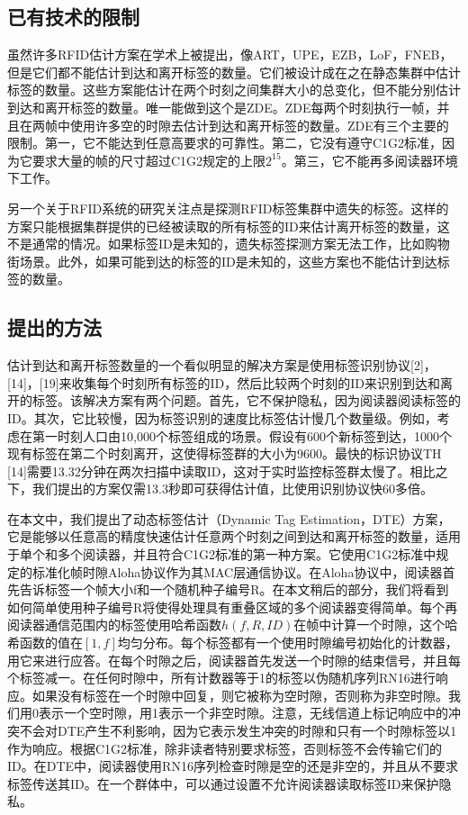 \documentclass[UTF8]{ctexart}
\begin{document}
	\subsection{已有技术的限制}
	虽然许多RFID估计方案在学术上被提出，像ART，UPE，EZB，LoF，FNEB，但是它们都不能估计到达和离开标签的数量。它们被设计成在之在静态集群中估计标签的数量。这些方案能估计在两个时刻之间集群大小的总变化，但不能分别估计到达和离开标签的数量。唯一能做到这个是ZDE。ZDE每两个时刻执行一帧，并且在两帧中使用许多空的时隙去估计到达和离开标签的数量。ZDE有三个主要的限制。第一，它不能达到任意高要求的可靠性。第二，它没有遵守C1G2标准，因为它要求大量的帧的尺寸超过C1G2规定的上限$2^{15}$。第三，它不能再多阅读器环境下工作。
	
	另一个关于RFID系统的研究关注点是探测RFID标签集群中遗失的标签。这样的方案只能根据集群提供的已经被读取的所有标签的ID来估计离开标签的数量，这不是通常的情况。如果标签ID是未知的，遗失标签探测方案无法工作，比如购物街场景。此外，如果可能到达的标签的ID是未知的，这些方案也不能估计到达标签的数量。
	
	\subsection{提出的方法}
	估计到达和离开标签数量的一个看似明显的解决方案是使用标签识别协议[2]，[14]，[19]来收集每个时刻所有标签的ID，然后比较两个时刻的ID来识别到达和离开的标签。该解决方案有两个问题。首先，它不保护隐私，因为阅读器阅读标签的ID。其次，它比较慢，因为标签识别的速度比标签估计慢几个数量级。例如，考虑在第一时刻人口由10,000个标签组成的场景。假设有600个新标签到达，1000个现有标签在第二个时刻离开，这使得标签群的大小为9600。最快的标识协议TH [14]需要13.32分钟在两次扫描中读取ID，这对于实时监控标签群太慢了。相比之下，我们提出的方案仅需13.3秒即可获得估计值，比使用识别协议快60多倍。
	
	在本文中，我们提出了动态标签估计（Dynamic Tag Estimation，DTE）方案，它是能够以任意高的精度快速估计任意两个时刻之间到达和离开标签的数量，适用于单个和多个阅读器，并且符合C1G2标准的第一种方案。它使用C1G2标准中规定的标准化帧时隙Aloha协议作为其MAC层通信协议。在Aloha协议中，阅读器首先告诉标签一个帧大小f和一个随机种子编号R。在本文稍后的部分，我们将看到如何简单使用种子编号R将使得处理具有重叠区域的多个阅读器变得简单。每个再阅读器通信范围内的标签使用哈希函数$h(f, R, ID)$在帧中计算一个时隙，这个哈希函数的值在$[1, f]$均匀分布。每个标签都有一个使用时隙编号初始化的计数器，用它来进行应答。在每个时隙之后，阅读器首先发送一个时隙的结束信号，并且每个标签减一。在任何时隙中，所有计数器等于1的标签以伪随机序列RN16进行响应。如果没有标签在一个时隙中回复，则它被称为空时隙，否则称为非空时隙。我们用0表示一个空时隙，用1表示一个非空时隙。注意，无线信道上标记响应中的冲突不会对DTE产生不利影响，因为它表示发生冲突的时隙和只有一个时隙标签以1作为响应。根据C1G2标准，除非读者特别要求标签，否则标签不会传输它们的ID。在DTE中，阅读器使用RN16序列检查时隙是空的还是非空的，并且从不要求标签传送其ID。在一个群体中，可以通过设置不允许阅读器读取标签ID来保护隐私。
	
\end{document}
